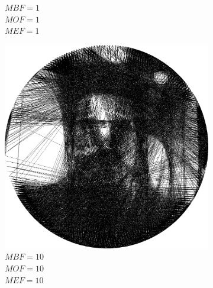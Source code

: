 \documentclass[a4paper, 12pt, polish, twoside]{extreport}
\begin{document}
\begin{figure}[H]
\begin{subfigure}{0.32\textwidth}
        \caption{\(MBF = 1\) \\ \(MOF = 1\) \\ \(MEF = 1\)}
        \label{mine-param-taco-thread-b}
    \end{subfigure}
    \begin{subfigure}{0.32\textwidth}
        \centering
        \includegraphics[width = \textwidth]{img/4-mine/taco-thread/taco_e_i3000_c20_inv0_bg10_obj10_ed10.png}
        \caption{\(MBF = 10\) \\ \(MOF = 10\) \\ \(MEF = 10\)}
        \label{mine-param-taco-thread-c}
    \end{subfigure}\\
    \begin{subfigure}{0.32\textwidth}
        \centering

\end{subfigure}
\end{figure}
\end{document}
